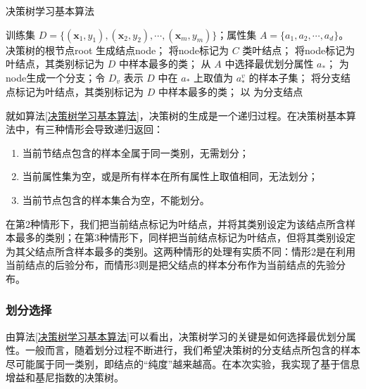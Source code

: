 \documentclass{ctexart}
\begin{document}
	\begin{algorithm}[!htb]
		\caption{决策树学习基本算法}  
		\label{决策树学习基本算法}
		\begin{algorithmic}[1]
			\Require  
			训练集 $D=\{(\bm{x}_1,y_1),(\bm{x}_2,y_2),\cdots,(\bm{x}_m,y_m)\}$；属性集 $A=\{a_1,a_2,\cdots,a_d\}$。
			\Ensure
			决策树的根节点root
			生成结点node；
				\State 将node标记为 $C$ 类叶结点；
				\Return
			\EndIf
				\State 将node标记为叶结点，其类别标记为 $D$ 中样本最多的类；
				\Return
			\EndIf
			\State 从 $A$ 中选择最优划分属性 $a_\ast$；
				\State 为node生成一个分支；令 $D_v$ 表示 $D$ 中在 $a_\ast$ 上取值为 $a_\ast^v$ 的样本子集；
					\State 将分支结点标记为叶结点，其类别标记为 $D$ 中样本最多的类；
					\Return
				\Else
					\State 以  为分支结点
				\EndIf
			\EndFor
			\EndFunction
		\end{algorithmic}  
	\end{algorithm}

	就如算法\ref{决策树学习基本算法}，决策树的生成是一个递归过程。在决策树基本算法中，有三种情形会导致递归返回：
	
	\begin{enumerate}
		\item 当前节结点包含的样本全属于同一类别，无需划分；
		\item 当前属性集为空，或是所有样本在所有属性上取值相同，无法划分；
		\item 当前节点包含的样本集合为空，不能划分。
	\end{enumerate}

	在第2种情形下，我们把当前结点标记为叶结点，并将其类别设定为该结点所含样本最多的类别；在第3种情形下，同样把当前结点标记为叶结点，但将其类别设定为其父结点所含样本最多的类别。这两种情形的处理有实质不同：情形2是在利用当前结点的后验分布，而情形3则是把父结点的样本分布作为当前结点的先验分布。
	
	\subsubsection{划分选择}
	
	由算法\ref{决策树学习基本算法}可以看出，决策树学习的关键是如何选择最优划分属性。一般而言，随着划分过程不断进行，我们希望决策树的分支结点所包含的样本尽可能属于同一类别，即结点的“纯度”越来越高。在本次实验，我实现了基于信息增益和基尼指数的决策树。
	
\end{document}
